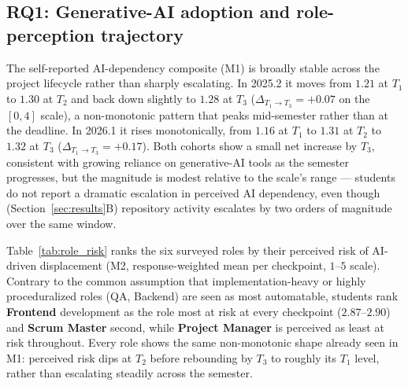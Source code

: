 \documentclass[conference]{IEEEtran}
\begin{document}

\subsection{RQ1: Generative-AI adoption and role-perception trajectory}

The self-reported AI-dependency composite (M1) is broadly stable across the
project lifecycle rather than sharply escalating. In 2025.2 it moves from
$1.21$ at $T_1$ to $1.30$ at $T_2$ and back down slightly to $1.28$ at $T_3$
($\Delta_{T_1 \to T_3}{=}+0.07$ on the $[0,4]$ scale), a non-monotonic
pattern that peaks mid-semester rather than at the deadline. In 2026.1 it
rises monotonically, from $1.16$ at $T_1$ to $1.31$ at $T_2$ to $1.32$ at
$T_3$ ($\Delta_{T_1 \to T_3}{=}+0.17$). Both cohorts show a small net
increase by $T_3$, consistent with growing reliance on generative-AI tools
as the semester progresses, but the magnitude is modest relative to the
scale's range --- students do not report a dramatic escalation in perceived
AI dependency, even though (Section~\ref{sec:results}B) repository activity
escalates by two orders of magnitude over the same window.

Table~\ref{tab:role_risk} ranks the six surveyed roles by their perceived
risk of AI-driven displacement (M2, response-weighted mean per checkpoint,
$1$--$5$ scale). Contrary to the common assumption that implementation-heavy
or highly proceduralized roles (QA, Backend) are seen as most automatable,
students rank \textbf{Frontend} development as the role most at risk at
every checkpoint ($2.87$--$2.90$) and \textbf{Scrum Master} second, while
\textbf{Project Manager} is perceived as least at risk throughout. Every
role shows the same non-monotonic shape already seen in M1: perceived risk
dips at $T_2$ before rebounding by $T_3$ to roughly its $T_1$ level, rather
than escalating steadily across the semester.
\end{document}
